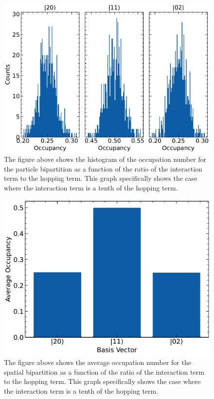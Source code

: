 \begin{figure}[H]
\centering
\includegraphics[scale=0.5]{../figures/sep_occ_hist_U_0.0001.pdf}
\caption{The figure above shows the histogram of the occupation number for the particle bipartition as a function of the ratio of the interaction term to the hopping term. This graph specifically shows the case where the interaction term is a tenth of the hopping term.}
\label{fig:sep_occ_hist_U_0.0001}
\end{figure}

\begin{figure}[H]
\centering
\includegraphics[scale=0.5]{../figures/spatial_avg_occ_U_0.0001.pdf}
\caption{The figure above shows the average occupation number for the spatial bipartition as a function of the ratio of the interaction term to the hopping term. This graph specifically shows the case where the interaction term is a tenth of the hopping term.}
\label{fig:spatial_avg_occ_U_0.0001}
\end{figure}

